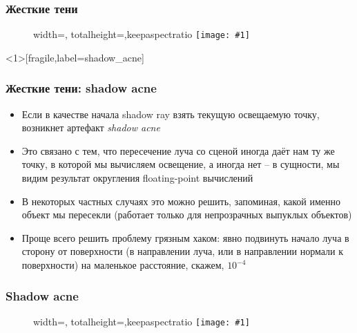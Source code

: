 \documentclass[10pt]{beamer}
\newcommand{\slideimage}[1]{
  \begin{figure}
    \begin{adjustbox}{width=\textwidth, totalheight=\textheight-2\baselineskip-2\baselineskip,keepaspectratio}
      \texttt{[image: \#1]}
    \end{adjustbox}
  \end{figure}
}
\begin{document}
\begin{frame}[fragile]
\frametitle{Жесткие тени}
\slideimage{shadows.png}
\end{frame}

\begin{frame}<1>[fragile,label=shadow_acne]
\frametitle{Жесткие тени: shadow acne}
\begin{itemize}
\item Если в качестве начала shadow ray взять текущую освещаемую точку, возникнет артефакт \textit{shadow acne}
\pause
\item Это связано с тем, что пересечение луча со сценой иногда даёт нам ту же точку, в которой мы вычисляем освещение, а иногда нет -- в сущности, мы видим результат округления floating-point вычислений
\pause
\item В некоторых частных случаях это можно решить, запоминая, какой именно объект мы пересекли (работает только для непрозрачных выпуклых объектов)
\pause
\item Проще всего решить проблему грязным хаком: явно подвинуть начало луча в сторону от поверхности (в направлении луча, или в направлении нормали к поверхности) на маленькое расстояние, скажем, \begin{math}10^{-4}\end{math}
\end{itemize}
\end{frame}

\begin{frame}[fragile]
\frametitle{Shadow acne}
\slideimage{shadow_acne.png}
\end{frame}

\end{document}
